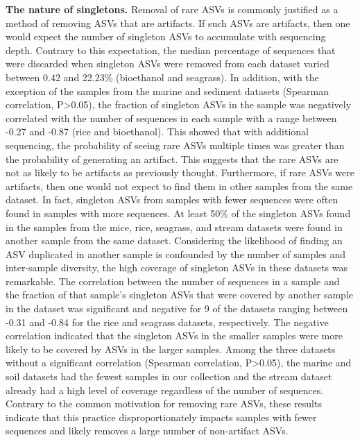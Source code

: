 \documentclass[]{article}
\begin{document}
\textbf{The nature of singletons.} Removal of rare ASVs is commonly
justified as a method of removing ASVs that are artifacts. If such ASVs
are artifacts, then one would expect the number of singleton ASVs to
accumulate with sequencing depth. Contrary to this expectation, the
median percentage of sequences that were discarded when singleton ASVs
were removed from each dataset varied between 0.42 and 22.23\%
(bioethanol and seagrass). In addition, with the exception of the
samples from the marine and sediment datasets (Spearman correlation,
P\textgreater{}0.05), the fraction of singleton ASVs in the sample was
negatively correlated with the number of sequences in each sample with a
range between -0.27 and -0.87 (rice and bioethanol). This showed that
with additional sequencing, the probability of seeing rare ASVs multiple
times was greater than the probability of generating an artifact. This
suggests that the rare ASVs are not as likely to be artifacts as
previously thought. Furthermore, if rare ASVs were artifacts, then one
would not expect to find them in other samples from the same dataset. In
fact, singleton ASVs from samples with fewer sequences were often found
in samples with more sequences. At least 50\% of the singleton ASVs
found in the samples from the mice, rice, seagrass, and stream datasets
were found in another sample from the same dataset. Considering the
likelihood of finding an ASV duplicated in another sample is confounded
by the number of samples and inter-sample diversity, the high coverage
of singleton ASVs in these datasets was remarkable. The correlation
between the number of sequences in a sample and the fraction of that
sample's singleton ASVs that were covered by another sample in the
dataset was significant and negative for 9 of the datasets ranging
between -0.31 and -0.84 for the rice and seagrass datasets,
respectively. The negative correlation indicated that the singleton ASVs
in the smaller samples were more likely to be covered by ASVs in the
larger samples. Among the three datasets without a significant
correlation (Spearman correlation, P\textgreater{}0.05), the marine and
soil datasets had the fewest samples in our collection and the stream
dataset already had a high level of coverage regardless of the number of
sequences. Contrary to the common motivation for removing rare ASVs,
these results indicate that this practice disproportionately impacts
samples with fewer sequences and likely removes a large number of
non-artifact ASVs.
\end{document}
